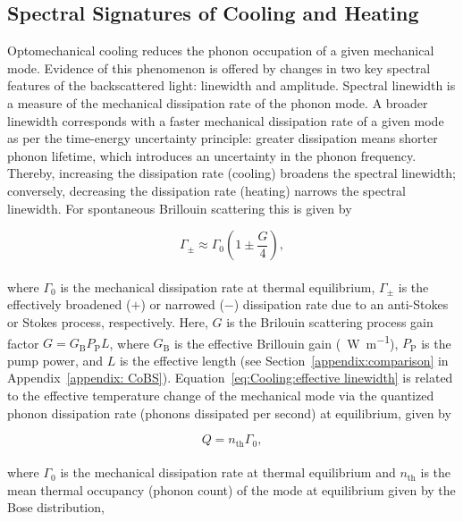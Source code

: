 \subsection{Spectral Signatures of Cooling and Heating}
\label{Cooling:subsec:SpectralSignaturesofCoolingandHeating}

Optomechanical cooling reduces the phonon occupation of a given mechanical mode. Evidence of this phenomenon is offered by changes in two key spectral features of the backscattered light: linewidth and amplitude. Spectral linewidth is a measure of the mechanical dissipation rate of the phonon mode. A broader linewidth corresponds with a faster mechanical dissipation rate of a given mode as per the time-energy uncertainty principle: greater dissipation means shorter phonon lifetime, which introduces an uncertainty in the phonon frequency. Thereby, increasing the dissipation rate (cooling) broadens the spectral linewidth; conversely, decreasing the dissipation rate (heating) narrows the spectral linewidth. For spontaneous Brillouin scattering this is given by \cite{otterstrom2018optomechanical}

\begin{equation}
  \Gamma_{\pm} \approx \Gamma_{0}\left(1 \pm \frac{G}{4}\right),
  \label{eq:Cooling:effective linewidth}
\end{equation}
\\
where \(\Gamma_{0}\) is the mechanical dissipation rate at thermal equilibrium, \(\Gamma_{\pm}\) is the effectively broadened (\(+\)) or narrowed (\(-\)) dissipation rate due to an anti-Stokes or Stokes process, respectively. Here, \(G\) is the Brilouin scattering process gain factor \(G = G_{\mathrm{B}}P_{\mathrm{P}}L\), where \(G_{\mathrm{B}}\) is the effective Brillouin gain (\si{\per\watt\per\meter}), \(P_{\mathrm{P}}\) is the pump power, and \(L\) is the effective length (see Section~\ref{appendix:comparison} in Appendix~\ref{appendix: CoBS}). Equation~\ref{eq:Cooling:effective linewidth} is related to the effective temperature change of the mechanical mode via the quantized phonon dissipation rate (phonons dissipated per second) at equilibrium, given by

\begin{equation}
  Q = n_{\mathrm{th}}\Gamma_{0},
  \label{eq:Cooling:Q}
\end{equation}
\\
where \(\Gamma_{0}\) is the mechanical dissipation rate at thermal equilibrium and \(n_{\mathrm{th}}\) is the mean thermal occupancy (phonon count) of the mode at equilibrium given by the Bose distribution,

